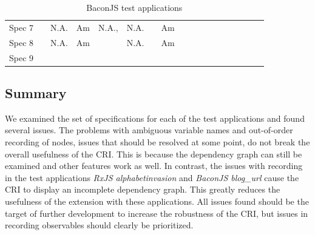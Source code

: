 \begin{table}[]
{\begin{tabular}{llllllllllllllllll}
		Spec 7 & \myes         & N.A.       & Am       & N.A.,\myes & N.A.       & \myes                                 & Am                   & \myes                 & \myes               & \myes               & \myes            & \myes         & \myes                   & \myes                & \myes                 & \myes       & \myes \\
		Spec 8 & \myes         & N.A.       & Am       & \myes      & N.A.       & \mno                                 & Am                   & \myes                 & \myes               & \myes               & \myes            & \mno         & \myes                   & \myes                & \myes                 & \myes       & \myes \\
		Spec 9 & \myes         & \myes         & \myes        & \myes      & \myes         & \myes                                 & \myes                    & \myes                 & \myes               & \myes               & \myes            & \myes         & \myes                   & \myes                & \myes                 & \myes       & \myes
	\end{tabular}%
}
\caption{BaconJS test applications}
\label{tab:BaconJS}
\end{table}

\subsection{Summary}
We examined the set of specifications for each of the test applications and found several issues. The problems with ambiguous variable names and out-of-order recording of nodes, issues that should be resolved at some point, do not break the overall usefulness of the CRI. This is because the dependency graph can still be examined and other features work as well. In contrast, the issues with recording in the test applications \emph{RxJS alphabetinvasion} and \emph{BaconJS blog\_url} cause the CRI to display an incomplete dependency graph. This greatly reduces the usefulness of the extension with these applications.
All issues found should be the target of further development to increase the robustness of the CRI, but issues in recording observables should clearly be prioritized.